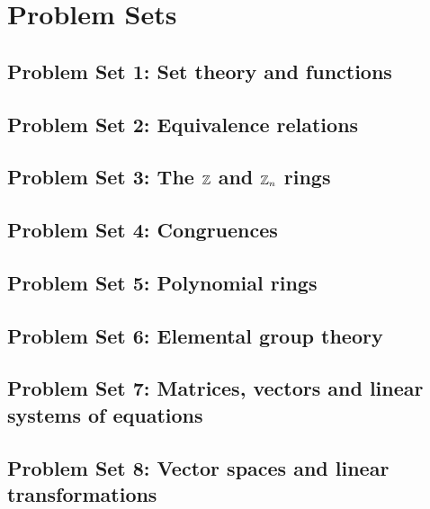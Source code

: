 \documentclass{lecturenotes}
\date{20/21 B1 S1}
\begin{document}

    
    
    
    
    
    

    \appendix
    \chapter{Problem Sets}
    \thispagestyle{noheaders}
        \section{Problem Set 1: Set theory and functions}
        \section{Problem Set 2: Equivalence relations}
        \section{Problem Set 3: The $\mathbb{Z}$ and $\mathbb{Z}_n$ rings}
        \section{Problem Set 4: Congruences}
        \section{Problem Set 5: Polynomial rings}
        \section{Problem Set 6: Elemental group theory}
        \section{Problem Set 7: Matrices, vectors and linear systems of equations}
        \section{Problem Set 8: Vector spaces and linear transformations}


    \nocite{*}
    
    \thispagestyle{noheaders}
\end{document}
